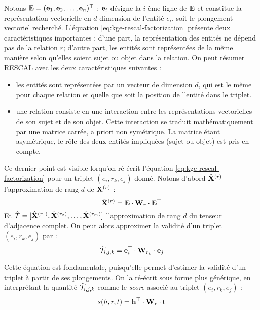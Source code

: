 Notons $\bf{E} = (\bf{e}_1, \bf{e}_2, \ldots, \bf{e}_n)^\top$ : $\bf{e}_i$ désigne la $i$-ème ligne de $\bf{E}$ et constitue la représentation vectorielle en $d$ dimension de l'entité $e_i$, soit le plongement vectoriel recherché. L'équation \ref{eq:kge-rescal-factorization} présente deux caractéristiques importantes : d'une part, la représentation des entités ne dépend pas de la relation $r$; d'autre part, les entités sont représentées de la même manière selon qu'elles soient sujet ou objet dans la relation. On peut résumer RESCAL avec les deux caractéristiques suivantes :
\begin{itemize}
    \item les entités sont représentées par un vecteur de dimension $d$, qui est le même pour chaque relation et quelle que soit la position de l'entité dans le triplet. 
    \item une relation consiste en une interaction entre les représentations vectorielles de son sujet et de son objet. Cette interaction se traduit mathématiquement par une matrice carrée, a priori non symétrique. La matrice étant asymétrique, le rôle des deux entités impliquées (sujet ou objet) est pris en compte.
\end{itemize}

Ce dernier point est visible lorqu'on ré-écrit l'équation \ref{eq:kge-rescal-factorization} pour un triplet $(e_i, r_k, e_j)$ donné. Notons d'abord $\hat{\bf{X}}^{(r)}$ l'approximation de rang $d$ de $\bf{X}^{(r)}$ :
\begin{equation*}
    \hat{\bf{X}}^{(r)} = \bf{E} \cdot \bf{W}_r \cdot \bf{E}^\top
\end{equation*}
Et $\hat{\cal{T}} = [\hat{\bf{X}}^{(r_1)}, \hat{\bf{X}}^{(r_2)}, \ldots, \hat{\bf{X}}^{(r_m)}]$ l'approximation de rang $d$ du tenseur d'adjacence complet. On peut alors approximer la validité d'un triplet $(e_i, r_k, e_j)$ par :
\begin{equation}
    \hat{\cal{T}}_{i, j, k} = \bf{e}_i^\top \cdot \bf{W}_{r_k} \cdot \bf{e}_j
\end{equation}

Cette équation est fondamentale, puisqu'elle permet d'estimer la validité d'un triplet à partir de ses plongements. On la ré-écrit sous forme plus générique, en interprétant la quantité $\hat{\cal{T}}_{i, j, k}$ comme le \textit{score} associé au triplet $(e_i, r_k, e_j)$ : 
\begin{equation}
    s(h, r, t) = \mathbf{h}^\top \cdot \bf{W}_r \cdot \bf{t}
    \label{eq:rescal}
\end{equation}

